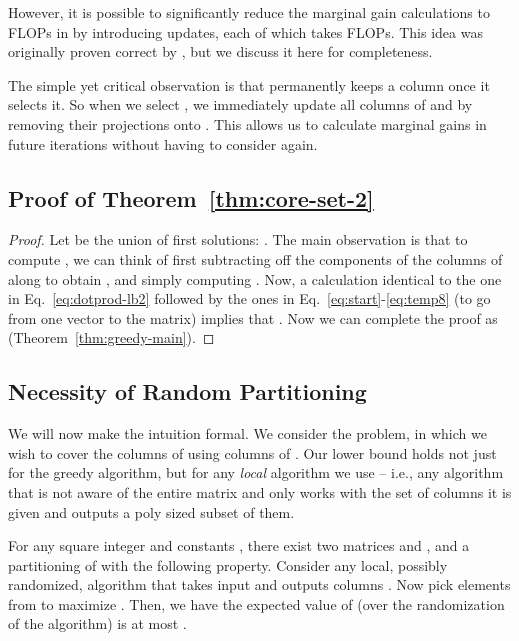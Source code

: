 \documentclass{article}
\begin{document}
However, it is possible to significantly reduce the marginal gain calculations to  FLOPs in  by introducing  updates, each of which takes  FLOPs. This idea was originally proven correct by \cite{Farahat2}, but we discuss it here for completeness.

The simple yet critical observation is that  permanently keeps a column  once it selects it. So when we select , we immediately update all columns of  and  by removing their projections onto . This allows us to calculate marginal gains in future iterations without having to consider  again.


\subsection{Proof of Theorem~\ref{thm:core-set-2}} \label{app:core-set-2}
\begin{proof}
  Let  be the union of first  solutions: . The main observation is that to compute , we can think of first subtracting off the components of the columns of  along  to obtain , and simply computing . Now, a calculation identical to the one in Eq.~\eqref{eq:dotprod-lb2} followed by the ones in Eq.~\eqref{eq:start}-\eqref{eq:temp8} (to go from one vector to the matrix) implies that .  Now we can complete the proof as (Theorem~\ref{thm:greedy-main}).
\iffalse
For any , we use  as the benchmark, and note that . On the other hand,  is equal to . So there is a gap of at least  to be exploited.  
Using Theorem~\ref{thm:core-set-1}, we know that in epoch  we find a set  with expected  at least . This can be rewritten as: 

 

where  is . By monotonicity of  and induction, we can prove that  is at least  which completes the proof. 
\fi
\end{proof}

\subsection{Necessity of Random Partitioning} \label{app:rand-part}
We will now make the intuition formal. We consider the  problem, in which we wish to cover the columns of  using columns of . Our lower bound holds not just for the greedy algorithm, but for any {\em local} algorithm we use -- i.e., any algorithm that is not aware of the entire matrix  and only works with the set of columns it is given and outputs a poly sized subset of them.

\begin{thm} \label{thm:rand-part}
For any square integer  and constants , there exist two matrices  and , and a partitioning of  with the following property. Consider any local, possibly randomized, algorithm that takes input  and outputs  columns .  Now pick  elements  from  to maximize . Then, we have the expected value of  (over the randomization of the algorithm) is at most .
\end{thm}
\end{document}
